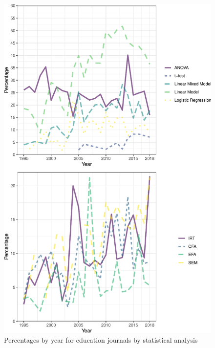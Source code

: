 \documentclass[
  english,
  ,man]{apa7}
\begin{document}
\begin{figure}
\centering
\includegraphics{software_files/figure-latex/model-year-at1-1.pdf}
\caption{\label{fig:model-year-at1}Percentages by year for education journals by statistical analysis}
\end{figure}
\end{document}
